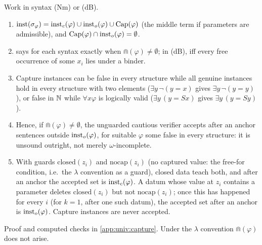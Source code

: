 \begin{proposition}[Capture]\label{prop:univ:capture}
Work in syntax (Nm) or (dB).
\begin{enumerate}[label=(\alph*)]
\item $\mathrm{inst}(\sigma_\varphi)=\mathrm{inst}_{c}(\varphi)\cup\mathrm{inst}_{o}(\varphi)\cup\mathrm{Cap}(\varphi)$ (the middle term if parameters are admissible), and $\mathrm{Cap}(\varphi)\cap\mathrm{inst}_{o}(\varphi)=\emptyset$.
\item {} says for each syntax exactly when $\Cap(\varphi)\neq\emptyset$; in (dB), iff every free occurrence of some $x_i$ lies under a binder.
\item Capture instances can be false in every structure while all genuine instances hold in every structure with two elements ($\exists y\,\neg(y=x)$ gives $\exists y\,\neg(y=y)$), or false in $\mathbb{N}$ while $\forall x\varphi$ is logically valid ($\exists y\,(y=Sx)$ gives $\exists y\,(y=Sy)$).
\item Hence, if $\Cap(\varphi)\neq\emptyset$, the unguarded cautious verifier accepts after an anchor sentences outside $\mathrm{inst}_{o}(\varphi)$, for suitable $\varphi$ some false in every structure: it is unsound outright, not merely $\omega$-incomplete.
\item With guards $\mathrm{closed}(z_i)$ and $\mathrm{nocap}(z_i)$ (no captured value: the free-for condition, i.e.\ the $\lambda$ convention as a guard), closed data teach both, and after an anchor the accepted set is $\mathrm{inst}_{c}(\varphi)$. A datum whose value at $z_i$ contains a parameter deletes $\mathrm{closed}(z_i)$ but not $\mathrm{nocap}(z_i)$; once this has happened for every $i$ (for $k=1$, after one such datum), the accepted set after an anchor is $\mathrm{inst}_{o}(\varphi)$. Capture instances are never accepted.
\end{enumerate}
\end{proposition}

\noindent Proof and computed checks in \cref{app:univ:capture}. Under the $\lambda$ convention $\Cap(\varphi)$ does not arise.

